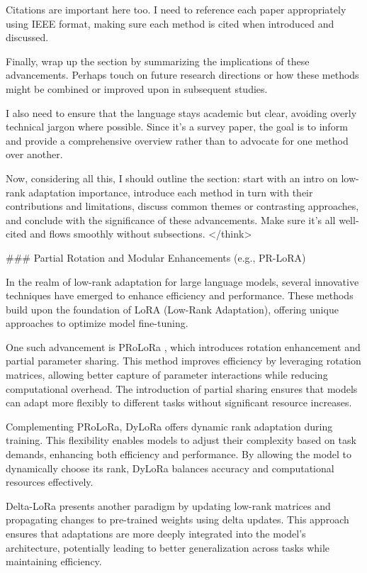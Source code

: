 \documentclass[conference]{IEEEtran}
\begin{document}
Citations are important here too. I need to reference each paper appropriately using IEEE format, making sure each method is cited when introduced and discussed.

Finally, wrap up the section by summarizing the implications of these advancements. Perhaps touch on future research directions or how these methods might be combined or improved upon in subsequent studies.

I also need to ensure that the language stays academic but clear, avoiding overly technical jargon where possible. Since it's a survey paper, the goal is to inform and provide a comprehensive overview rather than to advocate for one method over another.

Now, considering all this, I should outline the section: start with an intro on low-rank adaptation importance, introduce each method in turn with their contributions and limitations, discuss common themes or contrasting approaches, and conclude with the significance of these advancements. Make sure it's all well-cited and flows smoothly without subsections.
</think>

### Partial Rotation and Modular Enhancements (e.g., PR-LoRA)

In the realm of low-rank adaptation for large language models, several innovative techniques have emerged to enhance efficiency and performance. These methods build upon the foundation of LoRA (Low-Rank Adaptation), offering unique approaches to optimize model fine-tuning.

One such advancement is PRoLoRa \cite{b1}, which introduces rotation enhancement and partial parameter sharing. This method improves efficiency by leveraging rotation matrices, allowing better capture of parameter interactions while reducing computational overhead. The introduction of partial sharing ensures that models can adapt more flexibly to different tasks without significant resource increases.

Complementing PRoLoRa, DyLoRa \cite{b2} offers dynamic rank adaptation during training. This flexibility enables models to adjust their complexity based on task demands, enhancing both efficiency and performance. By allowing the model to dynamically choose its rank, DyLoRa balances accuracy and computational resources effectively.

Delta-LoRa \cite{b3} presents another paradigm by updating low-rank matrices and propagating changes to pre-trained weights using delta updates. This approach ensures that adaptations are more deeply integrated into the model's architecture, potentially leading to better generalization across tasks while maintaining efficiency.
\end{document}
